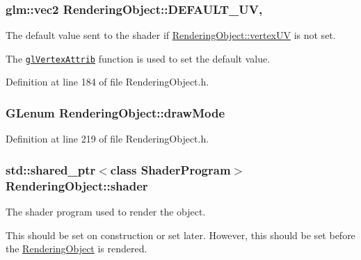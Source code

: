 \subsubsection[{D\+E\+F\+A\+U\+L\+T\+\_\+\+U\+V}]{\setlength{\rightskip}{0pt plus 5cm}glm\+::vec2 Rendering\+Object\+::\+D\+E\+F\+A\+U\+L\+T\+\_\+\+U\+V\hspace{0.3cm}{\ttfamily [static]}, {\ttfamily [protected]}}\label{class_rendering_object_a3dcb28a12f578630aea75cc59ea39588}


The default value sent to the shader if \hyperlink{class_rendering_object_afc405316bddec4ba1d5c228ecc0d9061}{Rendering\+Object\+::vertex\+U\+V} is not set. 

The \href{https://www.opengl.org/sdk/docs/man/html/glVertexAttrib.xhtml}{\tt gl\+Vertex\+Attrib} function is used to set the default value. 

Definition at line 184 of file Rendering\+Object.\+h.

\hypertarget{class_rendering_object_aa67856a72705b54a5667e91e270d00b3}{}
\subsubsection[{draw\+Mode}]{\setlength{\rightskip}{0pt plus 5cm}G\+Lenum Rendering\+Object\+::draw\+Mode\hspace{0.3cm}{\ttfamily [protected]}}\label{class_rendering_object_aa67856a72705b54a5667e91e270d00b3}


Definition at line 219 of file Rendering\+Object.\+h.

\hypertarget{class_rendering_object_ae50e545ce2008ffa802478cd4316e82e}{}
\subsubsection[{shader}]{\setlength{\rightskip}{0pt plus 5cm}std\+::shared\+\_\+ptr$<$class {\bf Shader\+Program}$>$ Rendering\+Object\+::shader\hspace{0.3cm}{\ttfamily [protected]}}\label{class_rendering_object_ae50e545ce2008ffa802478cd4316e82e}


The shader program used to render the object. 

This should be set on construction or set later. However, this should be set before the \hyperlink{class_rendering_object}{Rendering\+Object} is rendered. 

